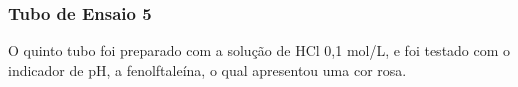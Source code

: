     \newpage

    \subsubsection{Tubo de Ensaio 5}

        \indent O quinto tubo foi preparado com a solução de HCl 0,1 mol/L, e foi testado com o indicador de pH, a fenolftaleína, o qual apresentou uma cor rosa.\\

        \begin{figure}[ht]
            \centering
                \qquad

\end{figure}
